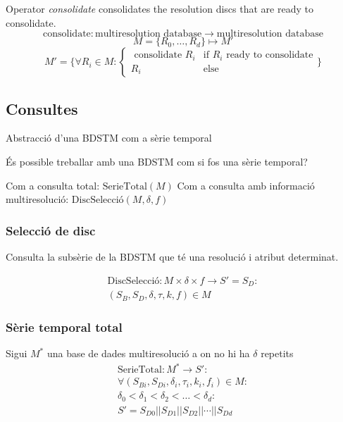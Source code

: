 \begin{definition}
  Operator \emph{consolidate} consolidates the resolution discs that
  are ready to consolidate.
  \[
  \text{consolidate}: \text{multiresolution database} \longrightarrow
  \text{multiresolution database}
  \]
  \[
  M=\{R_0,\dotsc,R_d\} \mapsto M'
  \]
  \[
  M'= \big\{
  \forall R_i\in M: 
  \begin{cases}
    \text{ consolidate } R_i & \text{if } R_i \text{ ready to consolidate} \\
    R_i & \text{else }
  \end{cases}\big\}
  \]
\end{definition}





\subsection{Consultes}


Abstracció d'una BDSTM com a sèrie temporal

És possible treballar amb una BDSTM com si fos una sèrie temporal?

Com a consulta total: $\text{SerieTotal}(M)$
Com a consulta amb informació multiresolució: $\text{DiscSelecció}(M,\delta,f)$


\subsubsection{Selecció de disc}


Consulta la subsèrie de la BDSTM que té una resolució i atribut
determinat. 


\begin{definition}[DiscSelecció]
  \begin{gather*}
    \text{DiscSelecció}: M \times \delta \times f \longrightarrow S' = S_D: \\
    (S_B,S_D,\delta,\tau,k,f) \in M
\end{gather*}
\end{definition}



\subsubsection{Sèrie temporal total}



\begin{definition}
  Sigui $M^*$ una base de dades multiresolució a on no hi ha $\delta$ repetits
  \begin{gather*}
    \text{SerieTotal}: M^* \longrightarrow S': \\
    \forall (S_{Bi},S_{Di},\delta_i,\tau_i,k_i,f_i) \in M : \\
    \delta_0 < \delta_1 < \delta_2 < \dots < \delta_d : \\
    S' = S_{D0} || S_{D1} || S_{D2} || \dotsb || S_{Dd}
\end{gather*}
\end{definition}

